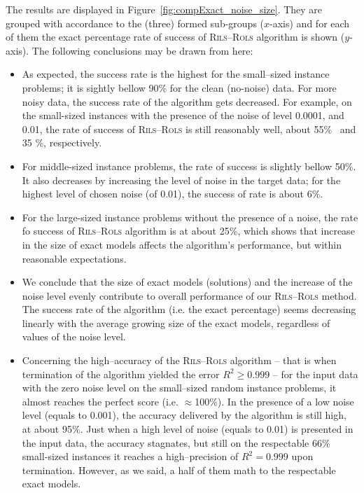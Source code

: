 \documentclass[a4paper,12pt]{elsarticle}
\begin{document}
The results are displayed in Figure~\ref{fig:compExact_noise_size}. They are grouped with accordance to the (three) formed sub-groups ($x$-axis) and for each of them the exact percentage rate of success of \textsc{Rils}--\textsc{Rols} algorithm is shown ($y$-axis). The following conclusions may be drawn from here:

\begin{itemize}
	\item   As expected, the success rate is the highest for the small--sized instance problems; it is sightly bellow 90\% for the clean (no-noise) data. For more noisy data, the success rate of the algorithm gets decreased. For example, on the small-sized instances with the presence of the noise of level 0.0001, and 0.01, the rate of success of \textsc{Rils}--\textsc{Rols} is still reasonably well, about 55\%~ and 35 \%, respectively. 
	\item For middle-sized instance problems, the rate of success is slightly bellow 50\%. It also decreases by increasing the level of noise in the target data; for the highest level of chosen noise (of 0.01), the success of rate is about 6\%. 
	\item For the large-sized instance problems without the presence of a noise, the rate fo success of \textsc{Rils}--\textsc{Rols} algorithm is at about 25\%, which shows that increase in the size of exact models affects the algorithm's performance, but within reasonable expectations.  
	
	\item We conclude that the size of exact models (solutions) and the increase of the noise level evenly contribute to overall performance of our \textsc{Rils}--\textsc{Rols} method. The success rate of the algorithm (i.e. the exact percentage) seems decreasing linearly  with the average growing size of the exact models, regardless of values of the noise level.
	
	 \item Concerning the high--accuracy of the \textsc{Rils}--\textsc{Rols} algorithm -- that is when termination of the algorithm yielded the error $R^2 \geq 0.999$ -- for the input data with the zero noise level on the small--sized random instance problems, it almost reaches the perfect score (i.e. $\approx$100\%). In the presence of a low noise level (equals to 0.001), the accuracy delivered by the algorithm is still high, at about 95\%. Just when a high level of noise (equals to 0.01) is presented in the input data, the accuracy stagnates, but still on the respectable 66\% small-sized instances it reaches a high--precision of $R^2=0.999$ upon termination. However, as we said, a half of them math to the respectable exact models.
	 

\end{itemize}
\end{document}
